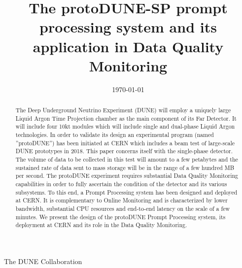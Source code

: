 \documentclass[12pt]{article}
\newcommand{\pd}{protoDUNE\xspace}
\begin{document}

\title{The \pd-SP prompt processing system
and its application in Data Quality Monitoring}

\date{\today}

\maketitle

\centerline{The DUNE Collaboration}



\vspace{2cm}

\begin{abstract}

\noindent  The Deep Underground Neutrino Experiment (DUNE) will employ a uniquely
large Liquid Argon Time Projection chamber as the main component of its Far Detector.
It will include four 10kt modules which will include single and dual-phase Liquid Argon
technologies. In order to validate its design an experimental program (named
''protoDUNE'') has been initiated at CERN which includes a beam test of large-scale DUNE prototypes
in 2018. This paper concerns itself with the single-phase detector. The volume
of data to be collected in this test will amount to a few petabytes and the sustained rate of
data sent to mass storage will be in the range of a few hundred MB per second. The protoDUNE
experiment requires substantial Data Quality Monitoring capabilities in
order to fully ascertain the condition of the detector and its various subsystems. To this end,
a Prompt Processing system has been designed and deployed at CERN. It is complementary to
Online Monitoring and is characterized by lower bandwidth, substantial CPU resources and
end-to-end latency on the scale of a few minutes. We present the design of the \pd
Prompt Processing system, its deployment at CERN and its role in the Data Quality Monitoring.

\end{abstract}


\newpage
%

\newpage

\newpage
\end{document}
